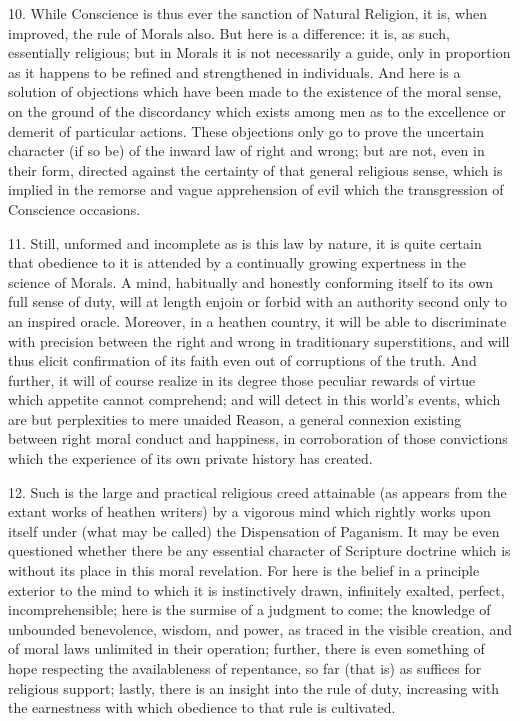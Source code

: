 10. While Conscience is thus ever the sanction of Natural Religion,
it is, when improved, the rule of Morals also. But here is a
difference: it is, as such, essentially religious; but in Morals it is
not necessarily a guide, only in proportion as it happens to be
refined and strengthened in individuals. And here is a solution of
objections which have been made to the existence of the moral sense,
on the ground of the discordancy which exists among men as to the
excellence or demerit of particular actions. These objections only go
to prove the uncertain character (if so be) of the inward law of right
and wrong; but are not, even in their form, directed against the
certainty of that general religious sense, which is implied in the
remorse and vague apprehension of evil which the transgression of
Conscience occasions.

11. Still, unformed and incomplete as is this law by nature, it is
quite certain that obedience to it is attended by a continually
growing expertness in the science of Morals. A mind, habitually and
honestly conforming itself to its own full sense of duty, will at
length enjoin or forbid with an authority second only to an inspired
oracle. Moreover, in a heathen country, it will be able to
discriminate with precision between the right and wrong in
traditionary superstitions, and will thus elicit confirmation of its
faith even out of corruptions of the truth. And further, it will of
course realize in its degree those peculiar rewards of virtue which
appetite cannot comprehend; and will detect in this world's events,
which are but perplexities to mere unaided Reason, a general connexion
existing between right moral conduct and happiness, in corroboration
of those convictions which the experience of its own private history
has created.

12. Such is the large and practical religious creed attainable (as
appears from the extant works of heathen writers) by a vigorous mind
which rightly works upon itself under (what may be called) the
Dispensation of Paganism. It may be even questioned whether there be
any essential character of Scripture doctrine which is without its
place in this moral revelation. For here is the belief in a principle
exterior to the mind to which it is instinctively drawn, infinitely
exalted, perfect, incomprehensible; here is the surmise of a judgment
to come; the knowledge of unbounded benevolence, wisdom, and power, as
traced in the visible creation, and of moral laws unlimited in their
operation; further, there is even something of hope respecting the
availableness of repentance, so far (that is) as suffices for
religious support; lastly, there is an insight into the rule of duty,
increasing with the earnestness with which obedience to that rule is
cultivated.

